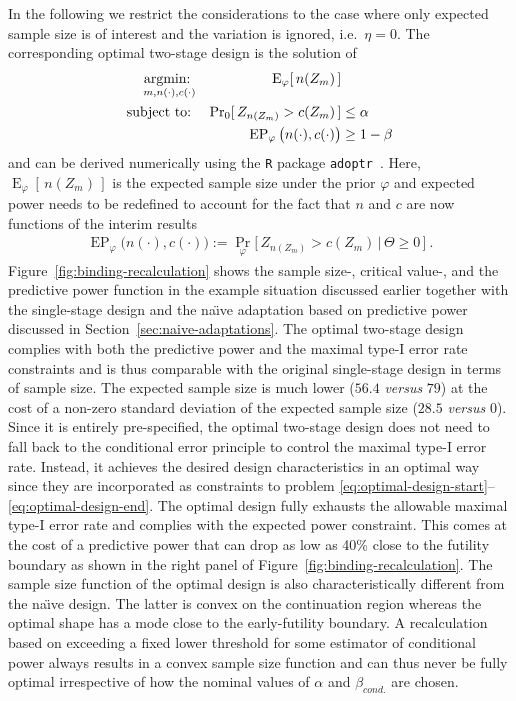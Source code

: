 \documentclass{article}
\renewcommand{\Pr}{\operatorname{Pr}}
\newcommand{\E}{\ensuremath{\operatorname{E}}}
\newcommand{\st}{\operatorname{subject\ to:\ }}
\newcommand{\argmin}[1]{\operatornamewithlimits{argmin:\ }_{#1}}
\newcommand{\EP}{\ensuremath{\operatorname{EP}}}
\renewcommand{\Pr}{\ensuremath{\operatorname{Pr}}}
\begin{document}
In the following we restrict the considerations to the case
where only expected sample size is of interest and the variation is
ignored, i.e.~$\eta=0$.
The corresponding optimal two-stage design is the solution of
\begin{align}
    \argmin{m, n(\cdot), c(\cdot)} 
        &&                                   \E_\varphi[\,n(Z_m)\,] & \label{eq:optimal-design-start}\\
    \st &&                 \Pr_{0}[\,Z_{n(Z_m)} > c(Z_m)\,] & \leq \alpha \\
        &&     \EP_\varphi\big(n(\cdot), c(\cdot)\big) & \geq 1 - \beta \label{eq:optimal-design-end}
\end{align}
and can be derived numerically using the \texttt{R} package \texttt{adoptr}~\citep{adoptrjss2020}.
Here, $\E_\varphi[\,n(Z_m)\,]$ is the expected sample size under the prior $\varphi$ and expected power needs to be redefined to account for the
fact that $n$ and $c$ are now functions of the interim results
\begin{align}
    \EP_\varphi\big(n(\cdot), c(\cdot)\big) :=
    \Pr_\varphi\big[\,Z_{n(Z_m)}>c(Z_m)\,|\,\Theta\geq0\,\big] \ .
\end{align}
Figure~\ref{fig:binding-recalculation} shows the sample size-, critical value-, and the predictive power function in the example situation discussed earlier together with the single-stage design
and the na\"{\i}ve adaptation based on predictive power discussed in
Section~\ref{sec:naive-adaptations}.
The optimal two-stage design complies with both the predictive power and the maximal type-I error rate constraints and is thus comparable with the original single-stage design in terms of sample size.
The expected sample size is much lower ($56.4$ \emph{versus} $79$) at the cost of a non-zero standard deviation of the expected sample size ($28.5$ \emph{versus} $0$).
Since it is entirely pre-specified, 
the optimal two-stage design does not need to fall back to the conditional error principle to control the maximal type-I error rate.
Instead, it achieves the desired design characteristics in an optimal way since they are incorporated as constraints to problem \eqref{eq:optimal-design-start}--\eqref{eq:optimal-design-end}.
The optimal design fully exhausts the allowable maximal type-I error rate
and complies with the expected power constraint. 
This comes at the cost of a predictive power that can drop as low as 40\% close to the futility boundary
as shown in the right panel of Figure~\ref{fig:binding-recalculation}.
The sample size function of the optimal design is also 
characteristically different from the na\"{\i}ve design.
The latter is convex on the continuation region whereas the optimal
shape has a mode close to the early-futility boundary.
A recalculation based on exceeding a fixed lower threshold for 
some estimator of conditional power always results in a convex
sample size function and can thus never be fully optimal irrespective of how the nominal values of $\alpha$ and $\beta_{cond.}$
are chosen.
\end{document}
